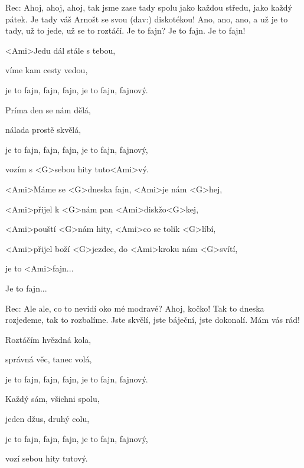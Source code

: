 


Rec: Ahoj, ahoj, ahoj, tak jsme zase tady spolu jako každou středu, jako každý pátek. Je tady váš Arnošt se svou (dav:) diskotékou! Ano, ano, ano, a už je to tady, už to jede, už se to roztáčí. Je to fajn? Je to fajn. Je to fajn!




\zs
<Ami>Jedu dál stále s tebou,

víme kam cesty vedou,

je to fajn, fajn, fajn, je to fajn, fajnový.

Príma den se nám dělá,

nálada prostě skvělá,

je to fajn, fajn, fajn, je to fajn, fajnový,

vozím s <G>sebou hity tuto<Ami>vý.
\ks




\zr
<Ami>Máme se <G>dneska fajn, <Ami>je nám <G>hej,

<Ami>přijel k <G>nám pan <Ami>diskžo<G>kej,

<Ami>pouští <G>nám hity, <Ami>co se tolik <G>líbí,

<Ami>přijel boží <G>jezdec, do <Ami>kroku nám <G>svítí,

je to <Ami>fajn...

Je to fajn...
\kr

Rec: Ale ale, co to nevidí oko mé modravé? Ahoj, kočko! Tak to dneska rozjedeme, tak to rozbalíme. Jste skvělí, jste báječní, jste dokonalí. Mám vás rád!


\zs
Roztáčím hvězdná kola,

správná věc, tanec volá,

je to fajn, fajn, fajn, je to fajn, fajnový.

Každý sám, všichni spolu,

jeden džus, druhý colu,

je to fajn, fajn, fajn, je to fajn, fajnový,

vozí sebou hity tutový.
\ks

\zr \kr

\zr \kr

\kp
